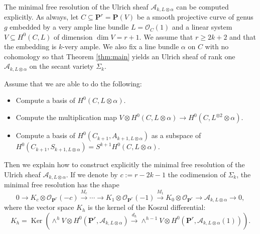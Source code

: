\documentclass[12pt]{amsart}
\numberwithin{equation}{section}
\numberwithin{thmcounter}{section}
\theoremstyle{definition}
\theoremstyle{claim}
\newcommand{\nP}{\mathbf{P}}
\newcommand{\sA}{\mathscr{A}}
\newcommand{\sO}{\mathscr{O}}
\DeclareMathOperator{\Ker}{Ker}
\begin{document}
The minimal free resolution of the Ulrich sheaf $\mathscr{A}_{k,L\otimes \alpha}$ can be computed explicitly. As always, let $C\subseteq \nP^r = \nP(V)$ be a smooth projective curve of genus $g$ embedded by a very ample line bundle $L=\sO_C(1)$ and a linear system $V\subseteq H^0(C,L)$ of dimension $\dim V=r+1$. We assume that $r\geq 2k+2$ and that the embedding is $k$-very ample. We also fix a line bundle $\alpha$ on $C$ with no cohomology so that  Theorem \ref{thm:main} yields an Ulrich sheaf of rank one $\sA_{k,L\otimes \alpha}$ on the secant variety $\Sigma_k$.
\medskip

\noindent
Assume that we are able to do the following:
\begin{itemize}
	\item Compute a basis of $H^0(C,L\otimes \alpha)$.
	\item Compute the multiplication map $V\otimes H^0(C,L\otimes \alpha) \to H^0(C,L^{\otimes 2}\otimes \alpha)$.
	\item Compute a basis of $H^0(C_{k+1},A_{k+1,L\otimes \alpha})$ as a subspace of $H^0(C_{k+1},S_{k+1,L\otimes \alpha}) = S^{k+1}H^0(C,L\otimes \alpha)$.
\end{itemize}

\noindent
Then we explain how to construct explicitly the minimal free resolution of the Ulrich sheaf $\mathscr{A}_{k,L\otimes \alpha}$.
If we denote by $c:=r-2k-1$ the codimension of $\Sigma_k$, the minimal free resolution has the shape
\begin{equation}\label{eq:mfrulrich}
	0 \longrightarrow K_{c} \otimes \sO_{\mathbf{P}^r}(-c) \overset{M_{c}}{\longrightarrow} \cdots \longrightarrow K_1 \otimes \sO_{\mathbf{P}^r}(-1)  \overset{M_1}\longrightarrow K_0 \otimes \sO_{\mathbf{P}^r} {\longrightarrow} \mathscr{A}_{k,L\otimes \alpha} \longrightarrow 0,
\end{equation}
where  the vector space $K_h$ is the kernel of the Koszul differential:
\[ K_h = \Ker \left( \wedge^h V \otimes H^0(\nP^r,\sA_{k,L\otimes \alpha}) \overset{d_h}{\longrightarrow} \wedge^{h-1} V \otimes H^0(\nP^r,\sA_{k,L\otimes \alpha}(1)) \right). \]
\end{document}
